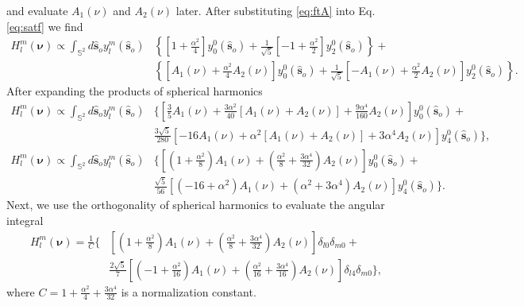 \documentclass{osa-article}
\providecommand{\so}[1]{\mathbf{\hat{s}}_o}
\providecommand{\mbb}[1]{\mathbb{#1}}
\providecommand{\bs}[1]{\boldsymbol{#1}}
\begin{document}
and evaluate $A_1(\nu)$ and $A_2(\nu)$ later. After substituting \ref{eq:ftA}
into Eq. \ref{eq:satf} we find 
\begin{align}
  H_l^m(\bs{\nu}) \propto \int_{\mbb{S}^2}d\so{}y_l^m(\so{})&\left\{\left[1 + \frac{\alpha^2}{4}\right]y_0^0(\so{}) + \frac{1}{\sqrt{5}}\left[-1 + \frac{\alpha^2}{2}\right]y_2^0(\so{})\right\} + \nonumber\\&\left\{\left[A_1(\nu) + \frac{\alpha^2}{4} A_2(\nu)\right]y_0^0(\so{}) + \frac{1}{\sqrt{5}}\left[- A_1(\nu) + \frac{\alpha^2}{2} A_2(\nu)\right]y_2^0(\so{})\right\}. 
\end{align}
After expanding the products of spherical harmonics
\begin{align}
  H_l^m(\bs{\nu}) \propto \int_{\mbb{S}^2}d\so{}y_l^m(\so{})&\Bigg\{\left[\frac{3}{5}A_1(\nu) + \frac{3\alpha^2}{40}[A_1(\nu) + A_2(\nu)] + \frac{9\alpha^4}{160}A_2(\nu)\right]y_0^0(\so{})+\nonumber\\&\frac{3\sqrt{5}}{280}\left[-16A_1(\nu) + \alpha^2[A_1(\nu) + A_2(\nu)] + 3\alpha^4 A_2(\nu)\right]y_4^0(\so{})\Bigg\},\\                             H_l^m(\bs{\nu}) \propto \int_{\mbb{S}^2}d\so{}y_l^m(\so{})&\Bigg\{\left[\left(1 + \frac{\alpha^2}{8}\right)A_1(\nu) + \left(\frac{\alpha^2}{8} + \frac{3\alpha^4}{32}\right)A_2(\nu)\right]y_0^0(\so{}) + \nonumber\\&\frac{\sqrt{5}}{56}\left[(-16 + \alpha^2)A_1(\nu) + (\alpha^2 + 3\alpha^4)A_2(\nu)\right]y_4^0(\so{})\Bigg\}.
\end{align}
Next, we use the orthogonality of spherical harmonics to evaluate the angular integral
\begin{align}
  H_l^m(\bs{\nu}) = \frac{1}{C}\Bigg\{&\left[\left(1 + \frac{\alpha^2}{8}\right)A_1(\nu) + \left(\frac{\alpha^2}{8} + \frac{3\alpha^4}{32}\right)A_2(\nu)\right]\delta_{l0}\delta_{m0}+\nonumber\\&\frac{2\sqrt{5}}{7}\left[\left(-1 + \frac{\alpha^2}{16}\right)A_1(\nu) + \left(\frac{\alpha^2}{16} + \frac{3\alpha^4}{16}\right)A_2(\nu)\right]\delta_{l4}\delta_{m0}\Bigg\}, 
\end{align}
where $C = 1 + \frac{\alpha^2}{4} + \frac{3\alpha^4}{32}$ is a normalization
constant.
\end{document}
